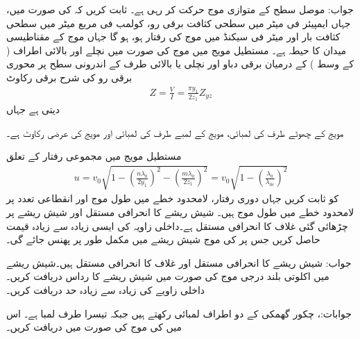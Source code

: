 جواب: 
موصل سطح کے متوازی  موج حرکت کر رہی ہے۔ ثابت کریں کہ  کی صورت میں، جہاں  ایمپیئر فی میٹر میں سطحی کثافت برقی رو،  کولمب فی مربع میٹر میں سطحی کثافت بار اور  میٹر فی سیکنڈ میں موج کی رفتار ہو،  ہو گا جہاں  موج کے مقناطیسی میدان  کا حیطہ ہے۔
مستطیل مویج میں  موج کی صورت میں نچلے اور بالائی اطراف ( کے وسط ) کے درمیان برقی دباو  اور نچلی یا بالائی طرف کے اندرونی سطح پر محوری برقی رو  کی شرح برقی رکاوٹ  
\begin{align}
Z=\frac{V}{I}=\frac{\pi y_1}{2 z_1} Z_{yz}
\end{align}
دیتی ہے جہاں
\begin{description}
 مویج کے چھوٹے طرف کی لمبائی،
 مویج کے لمبے طرف کی لمبائی اور
 مویج کی عرضی رکاوٹ ہے۔
\end{description}
مستطیل مویج میں مجموعی رفتار  کے تعلق
\begin{align}
u=v_0 \sqrt{1-\left(\frac{n \lambda_0}{2 y_1}\right)^2-\left(\frac{m \lambda_0}{2 z_1}\right)^2}=v_0 \sqrt{1-\left(\frac{\lambda_0}{\lambda_{0c}}\right)^2}
\end{align}
کو ثابت کریں جہاں  دوری رفتار،  لامحدود خطے میں طول موج اور  انقطاعی تعدد پر لامحدود خطے میں طول موج ہیں۔
شیش ریشے کا انحرافی مستقل  اور شیش ریشے پر چڑھائی گئی غلاف کا انحرافی مستقل  ہے۔داخلی زاویہ  کی ایسی زیادہ سے زیادہ قیمت حاصل کریں جس پر  کی موج شیش ریشے میں مکمل طور پر پھنس جائے گی۔

جواب: 
شیش ریشے کا انحرافی مستقل  اور غلاف کا انحرافی مستقل  ہیں۔شیش ریشے میں اکلوتی  بلند درجی موج کی صورت میں شیش ریشے کا رداس دریافت کریں۔ داخلی زاویے کی زیادہ سے زیادہ حد دریافت کریں۔

جوابات:، 
چکور گھمکی کے دو اطراف  لمبائی رکھتے ہیں جبکہ تیسرا طرف  لمبا ہے۔ اس میں  کی  موج کی صورت میں  دریافت کریں۔

